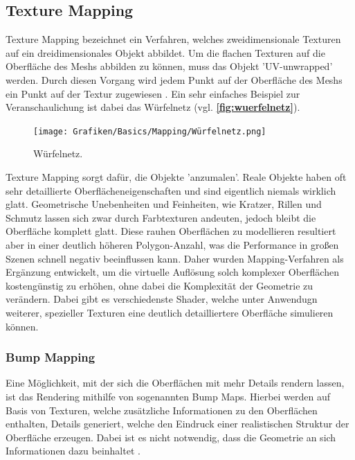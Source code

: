 \subsection{Texture Mapping}

Texture Mapping bezeichnet ein Verfahren, welches zweidimensionale Texturen auf ein dreidimensionales Objekt
abbildet. Um die flachen Texturen auf die Oberfläche des Meshs abbilden zu können, muss das Objekt 'UV-unwrapped' werden.
Durch diesen Vorgang wird jedem Punkt auf der Oberfläche des Meshs ein Punkt auf der Textur zugewiesen \parencite{Catmull1974} \parencite{Blinn1976}.
Ein sehr einfaches Beispiel zur Veranschaulichung ist dabei das Würfelnetz (vgl. \textbf{\autoref{fig:wuerfelnetz}}).
\begin{figure}[!h]
	\centering
	\texttt{[image: Grafiken/Basics/Mapping/Würfelnetz.png]}
	\begin{footnotesize}
		\caption{Würfelnetz.}
		\label{fig:wuerfelnetz}
	\end{footnotesize}
\end{figure}

Texture Mapping sorgt dafür, die Objekte 'anzumalen'.
Reale Objekte haben oft sehr detaillierte Oberflächeneigenschaften und sind eigentlich niemals wirklich glatt.
Geometrische Unebenheiten und Feinheiten, wie Kratzer, Rillen und Schmutz lassen sich zwar durch 
Farbtexturen andeuten, jedoch bleibt die Oberfläche komplett glatt. Diese rauhen Oberflächen zu modellieren resultiert
aber in einer deutlich höheren Polygon-Anzahl, was die Performance in großen Szenen schnell negativ beeinflussen kann.
Daher wurden Mapping-Verfahren als Ergänzung entwickelt, um die virtuelle Auflösung
solch komplexer Oberflächen kostengünstig zu erhöhen, ohne dabei die Komplexität der Geometrie zu verändern.
Dabei gibt es verschiedenste Shader, welche unter Anwendugn weiterer, spezieller Texturen eine deutlich detailliertere
Oberfläche simulieren können.


\subsubsection{Bump Mapping}

Eine Möglichkeit, mit der sich die Oberflächen mit mehr Details rendern lassen, ist das Rendering
mithilfe von sogenannten Bump Maps.
Hierbei werden auf Basis von Texturen, welche zusätzliche Informationen zu den Oberflächen enthalten,
Details generiert, welche den Eindruck einer realistischen Struktur der Oberfläche erzeugen.
Dabei ist es nicht notwendig, dass die Geometrie an sich Informationen dazu beinhaltet \parencite{Blinn1978}.

